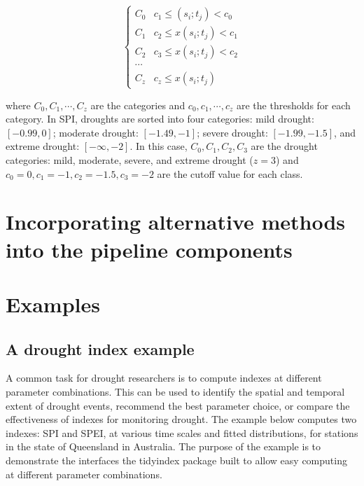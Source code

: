 \documentclass[
]{interact}
\begin{document}
\begin{equation}
\begin{cases}
C_0 & c_1 \leq (s_i; t_j) < c_0 \\
C_1 & c_2 \leq x(s_i; t_j) < c_1 \\
C_2 & c_3 \leq x(s_i; t_j) < c_2 \\
\cdots \\
C_z & c_z \leq x(s_i; t_j)
\end{cases}
\end{equation}

where \(C_0, C_1,\cdots ,C_z\) are the categories and
\(c_0, c_1, \cdots, c_z\) are the thresholds for each category. In SPI,
droughts are sorted into four categories: mild drought: \([-0.99, 0]\);
moderate drought: \([-1.49, -1]\); severe drought: \([-1.99, -1.5]\),
and extreme drought: \([-\infty, -2]\). In this case,
\(C_0, C_1, C_2, C_3\) are the drought categories: mild, moderate,
severe, and extreme drought (\(z = 3\)) and
\(c_0 =0, c_1 = -1, c_2 = -1.5, c_3 = -2\) are the cutoff value for each
class.

\hypertarget{sec-dev}{%
\section{Incorporating alternative methods into the pipeline
components}\label{sec-dev}}

\hypertarget{sec-examples}{%
\section{Examples}\label{sec-examples}}

\hypertarget{a-drought-index-example}{%
\subsection{A drought index example}\label{a-drought-index-example}}

A common task for drought researchers is to compute indexes at different
parameter combinations. This can be used to identify the spatial and
temporal extent of drought events, recommend the best parameter choice,
or compare the effectiveness of indexes for monitoring drought. The
example below computes two indexes: SPI and SPEI, at various time scales
and fitted distributions, for stations in the state of Queensland in
Australia. The purpose of the example is to demonstrate the interfaces
the tidyindex package built to allow easy computing at different
parameter combinations.
\end{document}
